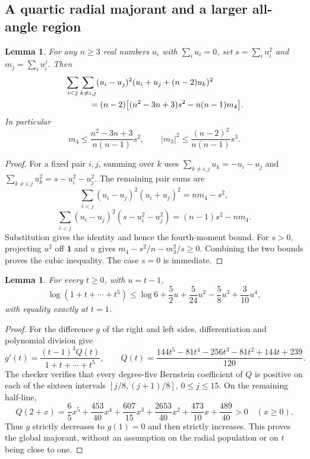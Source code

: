 \documentclass[11pt]{article}
\newtheorem{lemma}[theorem]{Lemma}
\theoremstyle{remark}
\numberwithin{equation}{section}
\begin{document}
\subsection{A quartic radial majorant and a larger all-angle region}

\begin{lemma}\label{lem:oct8-centered-radial-SOS}
For any $n\ge3$ real numbers $u_i$ with $\sum_i u_i=0$, set
$s=\sum_i u_i^2$ and $m_j=\sum_i u_i^j$. Then
\begin{align*}
 &\sum_{i<j}\sum_{k\ne i,j}(u_i-u_j)^2
                    (u_i+u_j+(n-2)u_k)^2\\
 &\hspace{10mm}=(n-2)
          \bigl[(n^2-3n+3)s^2-n(n-1)m_4\bigr].
\end{align*}
In particular
\[
 m_4\le\frac{n^2-3n+3}{n(n-1)}s^2,\qquad
 |m_3|^2\le\frac{(n-2)^2}{n(n-1)}s^3.
\]
\end{lemma}
\begin{proof}
For a fixed pair $i,j$, summing over $k$ uses
$\sum_{k\ne i,j}u_k=-u_i-u_j$ and
$\sum_{k\ne i,j}u_k^2=s-u_i^2-u_j^2$. The remaining pair sums are
\[
 \sum_{i<j}(u_i-u_j)^2(u_i+u_j)^2=nm_4-s^2,
\]
\[
 \sum_{i<j}(u_i-u_j)^2(s-u_i^2-u_j^2)=(n-1)s^2-nm_4.
\]
Substitution gives the identity and hence the fourth-moment bound.
For $s>0$, projecting $u^2$ off $\mathbf1$ and $u$ gives
$m_4-s^2/n-m_3^2/s\ge0$. Combining the two bounds proves the
cubic inequality. The case $s=0$ is immediate.
\end{proof}

\begin{lemma}\label{lem:oct8-six-quartic-log}
For every $t\ge0$, with $u=t-1$,
\[
 \log(1+t+\cdots+t^5)
 \le\log6+\frac52u+\frac5{24}u^2-\frac58u^3+\frac3{10}u^4,
\]
with equality exactly at $t=1$.
\end{lemma}
\begin{proof}
For the difference $g$ of the right and left sides, differentiation
and polynomial division give
\[
 g'(t)=\frac{(t-1)^3Q(t)}{1+t+\cdots+t^5},\qquad
 Q(t)=\frac{144t^5-81t^4-256t^3-81t^2+144t+239}{120}.
\]
The checker verifies that every degree-five Bernstein coefficient of
$Q$ is positive on each of the sixteen intervals
$[j/8,(j+1)/8]$, $0\le j\le15$. On the remaining half-line,
\[
 Q(2+x)=\frac65x^5+\frac{453}{40}x^4+\frac{607}{15}x^3
            +\frac{2653}{40}x^2+\frac{473}{10}x+\frac{489}{40}>0
                  \quad(x\ge0).
\]
Thus $g$ strictly decreases to $g(1)=0$ and then strictly increases.
This proves the global majorant, without an assumption on the radial
population or on $t$ being close to one.
\end{proof}
\end{document}
